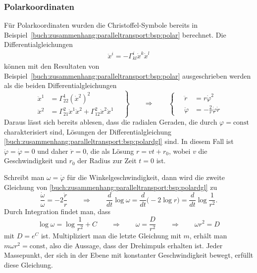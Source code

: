 \subsubsection{Polarkoordinaten}
Für Polarkoordinaten wurden die Christoffel-Symbole bereits
in Beispiel~\ref{buch:zusammenhang:paralleltransport:bsp:polar}
berechnet.
Die Differentialgleichungen
\begin{align*}
\ddot{x}^i=-\Gamma^i_{kl}\dot{x}^k\dot{x}^l
\end{align*}
können mit den Resultaten von 
Beispiel~\ref{buch:zusammenhang:paralleltransport:bsp:polar}
ausgeschrieben werden als die beiden Differentialgleichungen
\begin{equation}
\left.
\begin{aligned}
\ddot{x}^1
&=
\Gamma^1_{22}(\dot{x}^2)^2
\\
\ddot{x}^2
&=
\Gamma^2_{21}\dot{x}^1\dot{x}^2
+
\Gamma^2_{12}\dot{x}^2\dot{x}^1
\end{aligned}
\quad
\right\}
\qquad
\Rightarrow
\qquad
\left\{
\quad
\begin{aligned}
\ddot{r}
&=
r \dot{\varphi}^2
\\
\ddot{\varphi}
&=
-\frac{2}{r}\dot{\varphi}\dot{r}
\end{aligned}
\right.
\label{buch:zusammenhang:paralleltransport:bsp:polardgl}
\end{equation}
Daraus lässt sich bereits ablesen, dass die radialen Geraden, die
durch $\varphi=\text{const}$ charakterisiert sind, Lösungen
der Differentialgleichung
\eqref{buch:zusammenhang:paralleltransport:bsp:polardgl}
sind.
In diesem Fall ist $\ddot{\varphi}=\dot{\varphi}=0$ und
daher $\ddot{r}=0$, die als Lösung $r=vt+r_0$, wobei $v$ die Geschwindigkeit
und $r_0$ der Radius zur Zeit $t=0$ ist.

Schreibt man $\omega=\dot{\varphi}$ für die Winkelgeschwindigkeit, dann
wird die zweite Gleichung von
\eqref{buch:zusammenhang:paralleltransport:bsp:polardgl}
zu
\[
\frac{\dot{\omega}}{\omega}
=
-2\frac{\dot{r}}{r}
\qquad\Rightarrow\qquad
\frac{d}{dt}\log \omega
=
\frac{d}{dt}\bigl(-2\log r\bigr)
=
\frac{d}{dt}\log\frac{1}{r^2}.
\]
Durch Integration findet man, dass
\begin{equation}
\log \omega = \log\frac{1}{r^2} + C
\qquad\Rightarrow\qquad
\omega = \frac{D}{r^2}
\qquad\Rightarrow\qquad
\omega r^2 = D
\label{buch:zusammenhang:paralleltransport:bsp:drehimpuls}
\end{equation}
mit $D=e^C$ ist.
Multipliziert man die letzte Gleichung mit $m$, erhält man
$m\omega r^2=\text{const}$, also die Aussage, dass der Drehimpuls
erhalten ist.
Jeder Massepunkt, der sich in der Ebene mit konstanter Geschwindigkeit
bewegt, erfüllt diese Gleichung.

